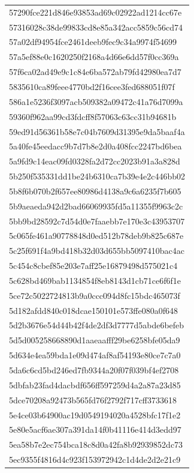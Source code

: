 \begin{tabular}{l}
57290fce221d846e93853ad69c02922ad1214cc67e \\
57316028c38de99833cd8e85a342acc5859c56cd74 \\
57a02df94954fce2461deeb9fec9c34a9974f54699 \\
57a5ef88e0c1620250f2168a4d66e6dd57f0cc369a \\
57f6ca02ad49e9c1c84e6ba572ab79fd42980ea7d7 \\
5835610ca89feee4770bd2f16cee3fed688051f07f \\
586a1e5236f3097acb509382a09472c41a76d7099a \\
59360f962aa99cd3fdcff8f57063c63cc31b94681b \\
59ed91d56361b58e7c04b7609d31395e9da5baaf4a \\
5a40fe45eedacc9b7d7b8e2d0a408fcc2247bd6bea \\
5a9fd9c14eac09fd0328fa2d72cc2023b91a3a828d \\
5b250f535331dd1be24b6310ca7b39e4e2c446bb02 \\
5b8f6b070b2f657ee80986d4138a9c6a6235f7b605 \\
5b9aeaeda942d2bad66069935fd5a11355f9963c2c \\
5bb9bd28592c7d54d0e7faaebb7e170e3c43953707 \\
5c065fe461a90778848d0ed512b78deb9b825c687e \\
5c25f691f4a9bd418b32d03d655bb5097410bac4ac \\
5c454c8cbef85e203e7aff25e16879498d575021c4 \\
5c628bd469bab1134854f8eb8143d1cb71ce6f6f1e \\
5ce72c5022724813b9a0ccc094d8fc15bdc465073f \\
5d182afdd840c018dcae150101e573ffe080a0f648 \\
5d2b3676e54d44b42f4de2df3d7777d5abde6befeb \\
5d5d005258668890d1aaeaafff29be6258bfe05da9 \\
5d634e4ea59bda1e09d474af8af54193e80ce7c7a0 \\
5da6c6cd5bd246ed7fb9344a20f07f039bf4ef2708 \\
5dbfab23fad4dacbdf656ff597259d4a2a87a23d85 \\
5dce70208a92473b565fd76f2792f717cff3733618 \\
5e4ce03b64900ac19d0549194020a4528bfc17f1e2 \\
5e80e5acf6ae307a391da14f0b41116e414d3edd97 \\
5ea58b7e2ec754bca18c8d0a42fa8b92939852dc73 \\
5ec9355f4816d4c923f153972942c1d4de2d2e21c9 \\

\end{tabular}
